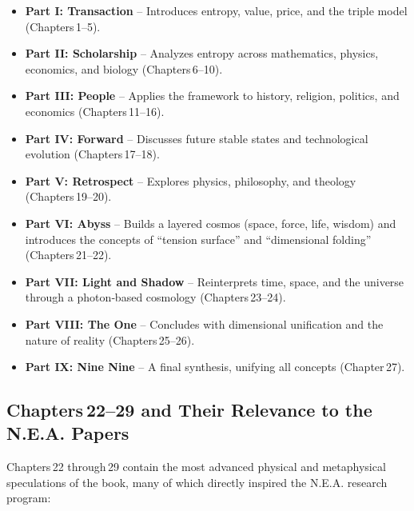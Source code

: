 \documentclass[12pt,a4paper]{article}
\begin{document}
\begin{itemize}
    \item \textbf{Part I: Transaction} – Introduces entropy, value, price, and the triple model (Chapters 1–5).
    \item \textbf{Part II: Scholarship} – Analyzes entropy across mathematics, physics, economics, and biology (Chapters 6–10).
    \item \textbf{Part III: People} – Applies the framework to history, religion, politics, and economics (Chapters 11–16).
    \item \textbf{Part IV: Forward} – Discusses future stable states and technological evolution (Chapters 17–18).
    \item \textbf{Part V: Retrospect} – Explores physics, philosophy, and theology (Chapters 19–20).
    \item \textbf{Part VI: Abyss} – Builds a layered cosmos (space, force, life, wisdom) and introduces the concepts of “tension surface” and “dimensional folding” (Chapters 21–22).
    \item \textbf{Part VII: Light and Shadow} – Reinterprets time, space, and the universe through a photon‑based cosmology (Chapters 23–24).
    \item \textbf{Part VIII: The One} – Concludes with dimensional unification and the nature of reality (Chapters 25–26).
    \item \textbf{Part IX: Nine Nine} – A final synthesis, unifying all concepts (Chapter 27).
\end{itemize}

\subsection*{Chapters 22–29 and Their Relevance to the N.E.A. Papers}
Chapters 22 through 29 contain the most advanced physical and metaphysical speculations of the book, many of which directly inspired the N.E.A. research program:
\end{document}
